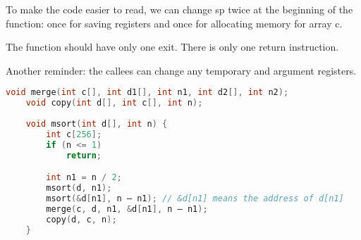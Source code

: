 \documentclass{article}
\begin{document}
\hfill \break
To make the code easier to read, we can change sp twice at the beginning of the function: once for saving registers and once for allocating memory for array c.

\hfill \break
The function should have only one exit. There is only one return instruction.

\hfill \break
Another reminder: the callees can change any temporary and argument registers.

\begin{lstlisting}[language=C]
    void merge(int c[], int d1[], int n1, int d2[], int n2);
    void copy(int d[], int c[], int n);
    
    void msort(int d[], int n) {
        int c[256];
        if (n <= 1)
            return;

        int n1 = n / 2;
        msort(d, n1);
        msort(&d[n1], n – n1); // &d[n1] means the address of d[n1]
        merge(c, d, n1, &d[n1], n – n1);
        copy(d, c, n);
    }
\end{lstlisting}

\break
\end{document}
